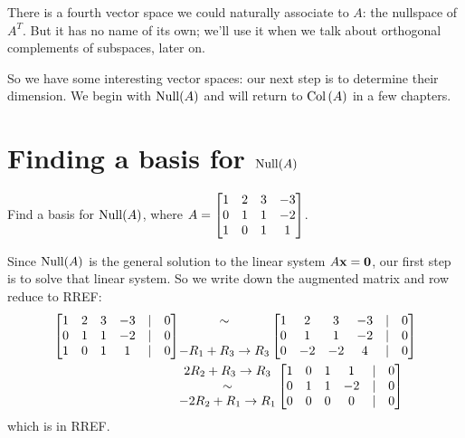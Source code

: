 There is a fourth vector space we could naturally associate to $A$:  the nullspace of $A^T$.
But it has no name of its own; we'll use it when we talk about orthogonal complements of subspaces, later on.


So we have some interesting vector spaces: our next step is to determine 
their dimension.  We begin with $\operatorname{Null}(A)$ and will return to $\operatorname{Col\,}(A)$ in 
a few chapters.

\section{Finding a basis for $\operatorname{Null}(A)$}  \mbox{}

\begin{myprob} Find a basis for $\operatorname{Null}(A)$, where $A = \left[ \begin{matrix} 
1 & 2 & 3 &-3\\ 
0 & 1 & 1 &-2\\ 
1 & 0 & 1 & 1 \end{matrix} \right]$.

\begin{mysol} Since $\operatorname{Null}(A)$ is the general solution to the linear system $A\mathbf{x}=\mathbf{0}$, our first step is to solve that linear system.  So we write down the augmented matrix and row reduce to RREF:
\begin{align*}
\left[ \begin{matrix} 1 & 2 & 3&-3&|&0\\ 0 & 1 & 1&-2&|&0\\ 1 & 0 & 1&1&|&0 \end{matrix} \right]
&\begin{matrix} \sim \\ \\ -R_1+R_3 \to R_3 \end{matrix}
\left[ \begin{matrix} 
1 & 2 & 3&-3&|&0\\ 
0 & 1 & 1&-2&|&0\\ 
0 & -2 & -2&4&|&0 \end{matrix} \right]\\
&\begin{matrix} 2R_2+R_3 \to R_3 \\ \sim\\ -2R_2+R_1\to R_1 \\  \end{matrix}
\left[ \begin{matrix} 
1 & 0 & 1&1&|&0\\ 
0 & 1 & 1&-2&|&0\\ 
0 & 0 & 0&0&|&0 \end{matrix} \right]
\end{align*}
which is in RREF.


\end{mysol}
\end{myprob}
